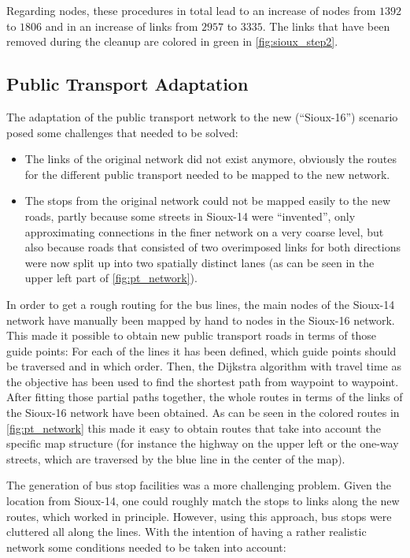 Regarding nodes, these procedures in total lead to an increase of nodes from
$1392$ to $1806$ and in an increase of links from $2957$ to $3335$. The links
that have been removed during the cleanup are colored in green in \cref{fig:sioux_step2}.

\subsection{Public Transport Adaptation}

The adaptation of the public transport network to the new (``Sioux-16'') scenario posed some
challenges that needed to be solved:

\begin{itemize}
\item The links of the original network did not exist anymore, obviously the
routes for the different public transport needed to be mapped to the new network.
\item The stops from the original network could not be mapped easily to the new
roads, partly because some streets in Sioux-14 were ``invented'', only approximating
connections in the finer network on a very coarse level, but also because roads
that consisted of two overimposed links for both directions were now split up into
two spatially distinct lanes (as can be seen in the upper left part of \cref{fig:pt_network}).
\end{itemize}

In order to get a rough routing for the bus lines, the main nodes of the Sioux-14
network have manually been mapped by hand to nodes in the Sioux-16 network. This
made it possible to obtain new public transport roads in terms of those guide points:
For each of the lines it has been defined, which guide points should be traversed
and in which order. Then, the Dijkstra algorithm \citep{Dijkstra} with travel time as the objective
has been used to find the shortest path from waypoint to waypoint. After fitting
those partial paths together, the whole routes in terms of the links of the Sioux-16
network have been obtained. As can be seen in the colored routes in \cref{fig:pt_network}
this made it easy to obtain routes that take into account the specific map structure
(for instance the highway on the upper left or the one-way streets, which are
traversed by the blue line in the center of the map).

The generation of bus stop facilities was a more challenging problem. Given the
location from Sioux-14, one could roughly match the stops to links along the new
routes, which worked in principle. However, using this approach, bus stops were
cluttered all along the lines. With the intention of having a rather realistic
network some conditions needed to be taken into account:

